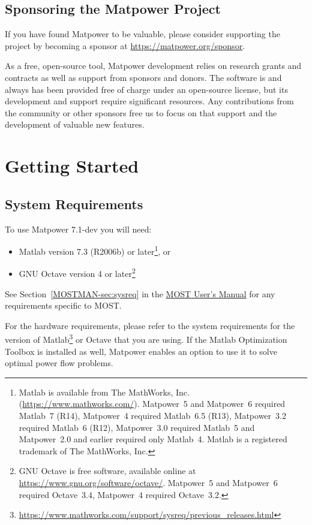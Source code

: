 \documentclass[12pt]{article}
\newcommand{\mpver}[0]{7.1-dev}
\newcommand{\matlab}[0]{{\sc Matlab}}
\newcommand{\matpower}[0]{{\sc Matpower}}
\newcommand{\most}[0]{{MOST}}
\newcommand{\mostver}[0]{1.0.2}
\newcommand{\ot}[0]{{Optimization Toolbox}}
\newcommand{\mostmanurl}[0]{https://matpower.org/docs/MOST-manual-\mostver.pdf}
\newcommand{\mostman}[0]{\href{\mostmanurl}{\most{} User's Manual}}
\numberwithin{equation}{section}
\numberwithin{table}{section}
\numberwithin{figure}{section}
\begin{document}
\subsection{Sponsoring the \matpower{} Project}
\label{sec:sponsor}

If you have found \matpower{} to be valuable, please consider supporting the project by becoming a sponsor at \url{https://matpower.org/sponsor}.

As a free, open-source tool, \matpower{} development relies on research grants and contracts as well as support from sponsors and donors. The software is and always has been provided free of charge under an open-source license, but its development and support require significant resources. Any contributions from the community or other sponsors free us to focus on that support and the development of valuable new features.

\clearpage
\section{Getting Started}

\subsection{System Requirements}
\label{sec:sysreq}
To use \matpower{} \mpver{} you will need:
\begin{itemize}
\item \matlab{}\textsuperscript{\tiny \textregistered} version 7.3 (R2006b) or later\footnote{\matlab{} is available from The MathWorks, Inc. (\url{https://www.mathworks.com/}). \matpower{}~5 and \matpower{}~6 required \matlab{}~7 (R14), \matpower{}~4 required \matlab{}~6.5 (R13), \matpower{}~3.2 required \matlab{}~6 (R12), \matpower{}~3.0 required \matlab{}~5 and \matpower{}~2.0 and earlier required only \matlab{}~4. \matlab{} is a registered trademark of The MathWorks, Inc.}, or
\item GNU Octave version 4 or later\footnote{GNU Octave \cite{octave} is free software, available online at \url{https://www.gnu.org/software/octave/}. \matpower{}~5 and \matpower{}~6 required Octave~3.4, \matpower{}~4 required Octave~3.2.}
\end{itemize}

See Section~\ref{MOSTMAN-sec:sysreq} in the \mostman{} for any requirements specific to \most{}.

For the hardware requirements, please refer to the system requirements for the version of \matlab{}\footnote{\url{https://www.mathworks.com/support/sysreq/previous_releases.html}} or Octave that you are using. If the \matlab{} \ot{} is installed as well, \matpower{} enables an option to use it to solve optimal power flow problems.
\end{document}
